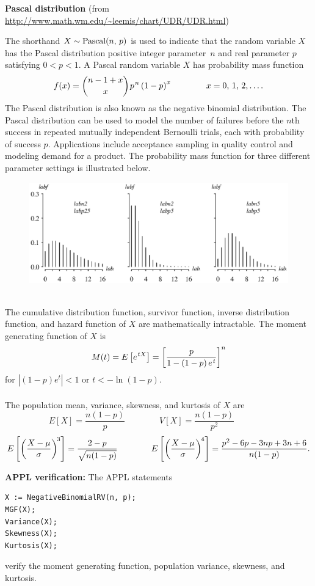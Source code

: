 \documentclass[12pt,fullpage]{article}
\begin{document}
\noindent
{\bf Pascal distribution} (from \color{blue}\url{http://www.math.wm.edu/~leemis/chart/UDR/UDR.html}\color{black})

\noindent
The shorthand $X \sim {\rm Pascal}(n,\, p)$ is used to indicate that the
random variable $X$ has the Pascal distribution positive integer parameter~$n$ and real parameter $p$ satisfying $0<p<1$.
A Pascal random variable $X$ has probability mass function 
$$
f(x) = {{n-1+x} \choose x} \kern 0.08 em p ^ {\kern 0.08 em n} \left(1
- p \right) ^ x \qquad \qquad x = 0,\, 1,\, 2, \ldots .
$$
The Pascal distribution is also known as the negative binomial distribution.
The Pascal distribution can be used to model the number of failures before the 
$n$th success in repeated mutually independent Bernoulli trials, each with probability 
of success $p$.
Applications include acceptance sampling in quality control and modeling demand for a product.
The probability mass function for three different parameter settings is illustrated below.
\begin{figure}[h!]
\begin{center}
\includegraphics[width=5.6in]{PascalPlot.ps}
\end{center}
\end{figure}
\\
The cumulative distribution function, survivor function, inverse distribution function, and hazard function of $X$ are mathematically intractable.
The moment generating function of $X$ is
$$
M(t) = E \left[ e ^ {\kern 0.08 em tX} \right] = \left[ \frac {p} {1 - \left( 1 - p \right) e ^ {\kern 0.08 em t}} \right] ^ n
$$
for $|(1 - p)e^t| < 1$ or $t < -\ln (1 - p).$\\ \\
The population mean, variance, skewness, and kurtosis of $X$ are
$$
E[X] = \frac{n(1-p)}{p} \qquad \qquad 
V[X] = \frac{n (1 - p)}{p^2} \qquad \qquad
$$
$$
E\left[ \left( \frac{X - \mu}{\sigma} \right) ^ {\kern -0.08 em 3} \right] =  \frac{2 - p}{\sqrt{n (1 - p)}} \qquad \qquad 
E\left[ \left( \frac{X - \mu}{\sigma} \right) ^ {\kern -0.08 em 4} \right] = \frac{p ^ 2 - 6p - 3np + 3n + 6}{n(1 - p)}.
$$

\vspace{0.1in}

\newpage

\noindent
{\bf APPL verification:}
The APPL statements
\begin{verbatim}
X := NegativeBinomialRV(n, p);
MGF(X);
Variance(X);
Skewness(X);
Kurtosis(X);
\end{verbatim}
verify the moment generating function, population variance, skewness, and kurtosis.
\end{document}
